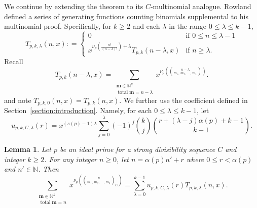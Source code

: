 \documentclass{amsart}
\newtheorem{lemma}[theorem]{Lemma}
\theoremstyle{definition}
\DeclareMathOperator{\total}{total}
\newcommand{\N}{\mathbb{N}}
\newcommand{\colonequal}{\mathrel{\mathop:}=}
\begin{document}
We continue by extending the theorem to its $C$-multinomial analogue. Rowland defined a series of generating functions counting binomials supplemental to his multinomial proof. Specifically, for $k\geq2$ and each $\lambda$ in the range $0 \leq \lambda\leq k-1$, $$T_{p,k,\lambda}(n,x)\colonequal\begin{cases}
    0&\text{if }0\leq n\leq \lambda-1
    \\
    x^{\nu_p\!\left(\frac{n!}{(n-\lambda)!}\right)+\lambda}T_{p,k}(n-\lambda,x)&\text{if }n\geq \lambda.
\end{cases}$$
Recall \[
T_{p,k}(n-\lambda, x) = \sum_{\substack{\mathbf{m} \in \mathbb{N}^k \\ \total\mathbf{m} = n-\lambda}} x^{\nu_p\!\left(\binom{n-\lambda}{m_1,\, m_2,\, \dots,\, m_k}\right)}.
\] and note $T_{p,k,0}(n,x)=T_{p,k}(n,x)$. 
We further use the coefficient defined in Section~\ref{section:introduction}. Namely, for each $0\leq \lambda \leq k-1$, let $$u_{p,k,C,\lambda}(r)=x^{(s(p)-1)\lambda}\sum_{j=0}^{\lambda}(-1)^j\binom{k}{j}\binom{r+(\lambda-j)\alpha(p)+k-1}{k-1}.$$


\begin{lemma} %
\label{lemma:idealCmultinomialSummationInBinomials}
Let $p$ be an ideal prime for a strong divisibility sequence $C$ and integer $k\geq2$. For any integer $n\geq0$, let $n=\alpha(p)n'+r$ where  $0 \leq r <\alpha(p)$ and $ n' \in \N $. Then
\[\sum_{\substack{\mathbf{m} \in \mathbb{N}^k \\ \total\mathbf{m} = n}} x^{\nu_p\!\left(\binom{n}{m_1,\, m_2,\, \dots,\, m_k}_C\right)} = \sum\limits_{\lambda=0}^{k-1}u_{p,k,C,\lambda}(r)T_{p,k,\lambda}(n,x).\]
\end{lemma}
\end{document}
